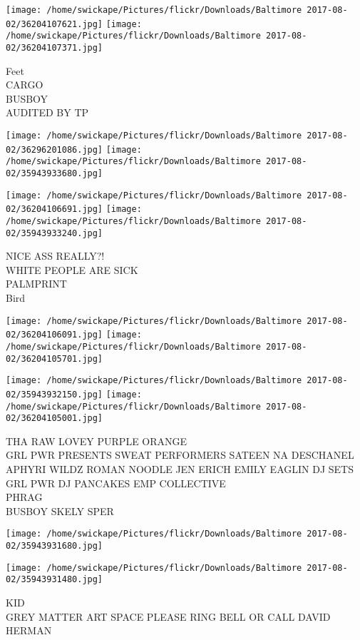 \documentclass[10pt,letterpaper]{article}
\begin{document}
\texttt{[image: /home/swickape/Pictures/flickr/Downloads/Baltimore 2017-08-02/36204107621.jpg]}
\texttt{[image: /home/swickape/Pictures/flickr/Downloads/Baltimore 2017-08-02/36204107371.jpg]}

Feet\\
CARGO\\
BUSBOY\\
AUDITED BY TP
\pagebreak

\texttt{[image: /home/swickape/Pictures/flickr/Downloads/Baltimore 2017-08-02/36296201086.jpg]}
\texttt{[image: /home/swickape/Pictures/flickr/Downloads/Baltimore 2017-08-02/35943933680.jpg]}

\texttt{[image: /home/swickape/Pictures/flickr/Downloads/Baltimore 2017-08-02/36204106691.jpg]}
\texttt{[image: /home/swickape/Pictures/flickr/Downloads/Baltimore 2017-08-02/35943933240.jpg]}

NICE ASS REALLY?!\\
WHITE PEOPLE ARE SICK\\
PALMPRINT\\
Bird
\pagebreak

\texttt{[image: /home/swickape/Pictures/flickr/Downloads/Baltimore 2017-08-02/36204106091.jpg]}
\texttt{[image: /home/swickape/Pictures/flickr/Downloads/Baltimore 2017-08-02/36204105701.jpg]}

\texttt{[image: /home/swickape/Pictures/flickr/Downloads/Baltimore 2017-08-02/35943932150.jpg]}
\texttt{[image: /home/swickape/Pictures/flickr/Downloads/Baltimore 2017-08-02/36204105001.jpg]}

THA RAW LOVEY PURPLE ORANGE\\
GRL PWR PRESENTS SWEAT PERFORMERS SATEEN  NA DESCHANEL APHYRI WILDZ ROMAN NOODLE JEN ERICH EMILY EAGLIN DJ SETS GRL PWR DJ PANCAKES EMP COLLECTIVE\\
PHRAG\\
BUSBOY SKELY SPER
\pagebreak

\texttt{[image: /home/swickape/Pictures/flickr/Downloads/Baltimore 2017-08-02/35943931680.jpg]}

\vspace{0.25in}
\texttt{[image: /home/swickape/Pictures/flickr/Downloads/Baltimore 2017-08-02/35943931480.jpg]}

KID\\
GREY MATTER ART SPACE PLEASE RING BELL OR CALL DAVID HERMAN
\pagebreak
\end{document}
